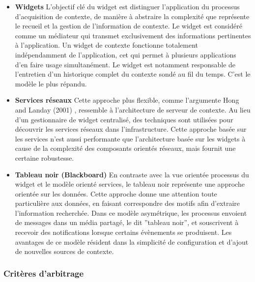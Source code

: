 \begin{itemize}
    \item \textbf{Widgets}
        L'objectif clé du widget est distinguer l'application du
        processus d'acquisition de contexte, de manière à abstraire la
        complexité que représente le recueil et la gestion de
        l'information de contexte. Le widget est considéré comme un
        médiateur qui transmet exclusivement des informations
        pertinentes à l'application. Un widget de contexte fonctionne
        totalement indépendamment de l'application, cet qui permet à
        plusieurs applications d'en faire usage simultanément. Le
        widget est notamment responsable de l'entretien d'un historique
        complet du contexte sondé au fil du temps. C'est le modèle le
        plus répandu.

    \item \textbf{Services réseaux}
        Cette approche plus flexible, comme l'argumente Hong
        and Landay (2001) \cite{hong_infrastructure_2001}, ressemble à
        l'architecture de serveur de contexte. Au lieu d'un
        gestionnaire de widget centralisé, des techniques sont utilisées
        pour découvrir les services réseaux dans l'infrastructure. Cette
        approche basée sur les services n'est aussi performante que
        l'architecture basée sur les widgets à cause de la complexité
        des composants orientés réseaux, mais fournit une certaine
        robustesse.

    \item \textbf{Tableau noir (Blackboard)}
        En contraste avec la vue orientée processus du widget et le modèle
        orienté services, le tableau noir représente une approche orientée sur
        les données. Cette approche donne une attention toute particulière aux
        données, en faisant correspondre des motifs afin d'extraire
        l'information recherchée. Dans ce modèle asymétrique, les processus
        envoient de messages dans un média partagé, le dit ''tableau noir'', et
        souscrivent à recevoir des notifications lorsque certains évènements se
        produisent. Les avantages de ce modèle résident dans la simplicité de
        configuration et d'ajout de nouvelles sources de contexte.
\end{itemize}

\subsubsection{Critères d'arbitrage}

